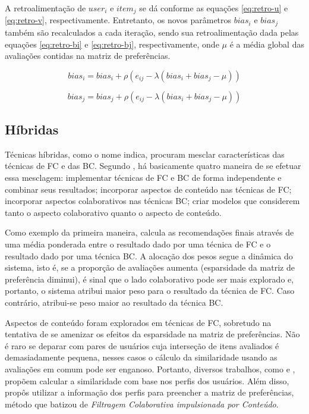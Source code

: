 A retroalimentação de $user_i$ e $item_j$ se dá conforme as equações \ref{eq:retro-u} e \ref{eq:retro-v}, respectivamente. Entretanto, os novos parâmetros $bias_i$ e $bias_j$ também são recalculados a cada iteração, sendo sua retroalimentação dada pelas equações \ref{eq:retro-bi} e \ref{eq:retro-bj}, respectivamente, onde $\mu$ é a média global das avaliações contidas na matriz de preferências.

\begin{equation}
bias_i = bias_i + \rho (e_{ij} - \lambda (bias_i + bias_j - \mu))
\label{eq:retro-bi}
\end{equation}

\begin{equation}
bias_j = bias_j + \rho (e_{ij} - \lambda (bias_i + bias_j - \mu))
\label{eq:retro-bj}
\end{equation}

\subsection{Híbridas}
Técnicas híbridas, como o nome indica, procuram mesclar características das técnicas de FC e das BC. Segundo \citep{Adomavicius:2005:TNG:1070611.1070751}, há basicamente quatro maneira de se efetuar essa mesclagem: implementar técnicas de FC e BC de forma independente e combinar seus resultados; incorporar aspectos de conteúdo nas técnicas de FC; incorporar aspectos colaborativos nas técnicas BC; criar modelos que considerem tanto o aspecto colaborativo quanto o aspecto de conteúdo.

Como exemplo da primeira maneira, \citep{Claypool99combiningcontent-based} calcula as recomendações finais através de uma média ponderada entre o resultado dado por uma técnica de FC e o resultado dado por uma técnica BC. A alocação dos pesos segue a dinâmica do sistema, isto é, se a proporção de avaliações aumenta (esparsidade da matriz de preferência diminui), é sinal que o lado colaborativo pode ser mais explorado e, portanto, o sistema atribui maior peso para o resultado da técnica de FC. Caso contrário, atribui-se peso maior ao resultado da técnica BC.

Aspectos de conteúdo foram explorados em técnicas de FC, sobretudo na tentativa de se amenizar os efeitos da esparsidade na matriz de preferências. Não é raro se deparar com pares de usuários cuja interseção de itens avaliados é demasiadamente pequena, nesses casos o cálculo da similaridade usando as avaliações em comum pode ser enganoso. Portanto, diversos trabalhos, como \citep{Pazzani:1999:FCC:340120.340130} e \citep{Balabanovic:1997:FCC:245108.245124}, propõem calcular a similaridade com base nos perfis dos usuários. Além disso, \citep{Melville:2002:CCF:777092.777124} propôs utilizar a informação dos perfis para preencher a matriz de preferências, método que batizou de \textit{Filtragem Colaborativa impulsionada por Conteúdo}.

